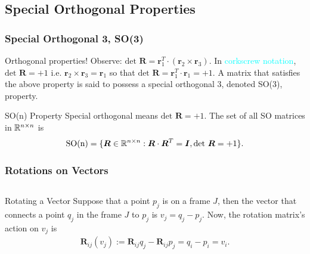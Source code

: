 \subsection{Special Orthogonal Properties}
\begin{frame}
	\frametitle{Special Orthogonal 3, SO(3)}
	\begin{block}{Orthogonal properties!}
			Observe: $\text{det }  \bm{R} = \bm{r}_1^T \cdot \left(\bm{r}_2 \times \bm{r}_3\right)$. In \textcolor{cyan}{corkscrew notation}, $\text{det }  \bm{R} = +1$ i.e. $\bm{r}_2 \times \bm{r}_3 = \bm{r}_1$ so that $\text{det }  \bm{R} = \bm{r}_1^T \cdot \bm{r}_1 = +1$. A matrix that satisfies the above property is said to \textcolor{light-blue}{possess a special orthogonal 3, denoted SO(3),  property}.
	\end{block}
	
	\begin{block}{SO(n) Property}
		Special orthogonal means $\text{det } \bm{R} = + 1$. The set of all SO matrices in $\mathbb{R}^{n\times n}$ is 
		\begin{align}
			\text{SO(n)} = \{\bm{R}\in \mathbb{R}^{n\times n}: \bm{R}\cdot \bm{R}^T = \bm{I}, \text{det }\bm{R} = + 1\}.
		\end{align}
	\end{block}
\end{frame}

\begin{frame}
	\frametitle{Rotations on Vectors}
	\begin{columns}[]
		\begin{column}{.85\linewidth}
			\begin{block}{Rotating a Vector}
				Suppose that a point $p_j$ is on a frame $J$, then the vector that connects a point $q_j$ in the frame $J$ to $p_j$ is $v_j = q_j - p_j$. Now, the rotation matrix's action on $v_j$ is
				\begin{align}
					\bm{R}_{ij}(v_j) := \bm{R}_{ij} q_j - \bm{R}_{ij} p_j = q_i - p_i = v_i.
				\end{align}
			\end{block}
		\end{column}
	\end{columns}
\end{frame}


